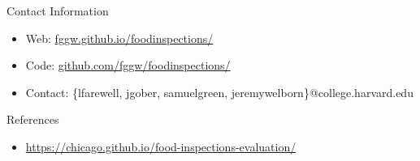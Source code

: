 \documentclass[final]{beamer}
\newlength{\onecolwid}
\begin{document}
\begin{frame}[t]
\begin{columns}[t]
\begin{column}{\onecolwid}






\begin{alertblock}{Contact Information}

\begin{itemize}
\item Web: \href{https://fggw.github.io/foodinspections/}{fggw.github.io/foodinspections/}
\item Code: \href{http://github.com/fggw/foodinspections}{github.com/fggw/foodinspections/}
\item Contact: \{lfarewell, jgober, samuelgreen, jeremywelborn\}@college.harvard.edu
\end{itemize}

\end{alertblock}


\begin{block}{References}
\begin{itemize}
    \item \href{https://chicago.github.io/food-inspections-evaluation/}{https://chicago.github.io/food-inspections-evaluation/}
\end{itemize}
\end{block}


\end{column} %

\end{columns} %

\end{frame} %
\end{document}
